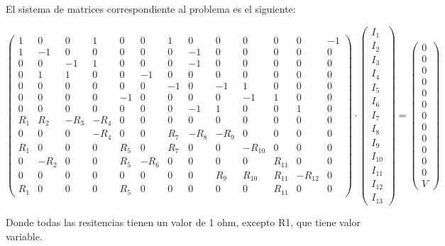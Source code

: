 \documentclass[12pt,thmsa]{article}
\begin{document}
\vspace{1pt}

El sistema de matrices correspondiente al problema es el siguiente:

$\left( 
\begin{array}{lllllllllllll}
1 & 0 & 0 & 1 & 0 & 0 & 1 & 0 & 0 & 0 & 0 & 0 & -1 \\ 
1 & -1 & 0 & 0 & 0 & 0 & 0 & -1 & 0 & 0 & 0 & 0 & 0 \\ 
0 & 0 & -1 & 1 & 0 & 0 & 0 & -1 & 0 & 0 & 0 & 0 & 0 \\ 
0 & 1 & 1 & 0 & 0 & -1 & 0 & 0 & 0 & 0 & 0 & 0 & 0 \\ 
0 & 0 & 0 & 0 & 0 & 0 & -1 & 0 & -1 & 1 & 0 & 0 & 0 \\ 
0 & 0 & 0 & 0 & -1 & 0 & 0 & 0 & 0 & -1 & 1 & 0 & 0 \\ 
0 & 0 & 0 & 0 & 0 & 0 & 0 & -1 & 1 & 0 & 0 & 1 & 0 \\ 
R_{1} & R_{2} & -R_{3} & -R_{4} & 0 & 0 & 0 & 0 & 0 & 0 & 0 & 0 & 0 \\ 
0 & 0 & 0 & -R_{4} & 0 & 0 & R_{7} & -R_{8} & -R_{9} & 0 & 0 & 0 & 0 \\ 
R_{1} & 0 & 0 & 0 & R_{5} & 0 & R_{7} & 0 & 0 & -R_{10} & 0 & 0 & 0 \\ 
0 & -R_{2} & 0 & 0 & R_{5} & -R_{6} & 0 & 0 & 0 & 0 & R_{11} & 0 & 0 \\ 
0 & 0 & 0 & 0 & 0 & 0 & 0 & 0 & R_{9} & R_{10} & R_{11} & -R_{12} & 0 \\ 
R_{1} & 0 & 0 & 0 & R_{5} & 0 & 0 & 0 & 0 & 0 & R_{11} & 0 & 0
\end{array}
\right) \cdot \left( 
\begin{array}{l}
I_{1} \\ 
I_{2} \\ 
I_{3} \\ 
I_{4} \\ 
I_{5} \\ 
I_{6} \\ 
I_{7} \\ 
I_{8} \\ 
I_{9} \\ 
I_{10} \\ 
I_{11} \\ 
I_{12} \\ 
I_{13}
\end{array}
\right) =\left( 
\begin{array}{l}
0 \\ 
0 \\ 
0 \\ 
0 \\ 
0 \\ 
0 \\ 
0 \\ 
0 \\ 
0 \\ 
0 \\ 
0 \\ 
0 \\ 
V
\end{array}
\right) $

Donde todas las resitencias tienen un valor de 1 ohm, excepto R1, que tiene
valor variable.
\end{document}
